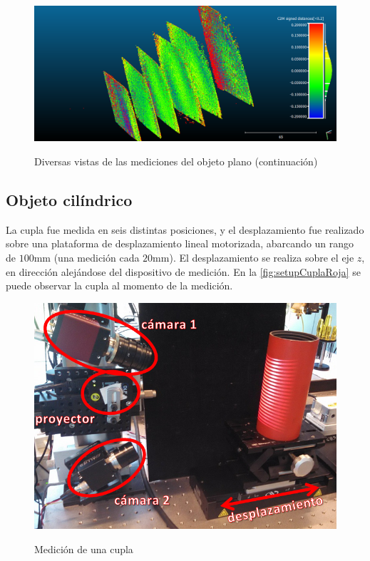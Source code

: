\begin{figure}[!bth]
{            \includegraphics[width=1.0\linewidth]{scans/patronPlanicidad/all_planeError_max200um}
        }
        \caption{Diversas vistas de las mediciones del objeto plano (continuación)}
        \label{fig:planeScanViews2}
\end{figure}

\FloatBarrier %
\subsection{Objeto cilíndrico}
La cupla fue medida en seis distintas posiciones, y el desplazamiento fue realizado sobre una plataforma de desplazamiento lineal motorizada, abarcando un rango de $100$mm (una medición cada $20$mm). El desplazamiento se realiza sobre el eje $z$, en dirección alejándose del dispositivo de medición. En la \autoref{fig:setupCuplaRoja} se puede observar la cupla al momento de la medición.

\begin{figure}[!bth]
    \myfloatalign
        {\includegraphics[width=1.0\linewidth]{images/setup/setup_cupla_explicado}}
        \caption{Medición de una cupla}
        \label{fig:setupCuplaRoja}
\end{figure}

